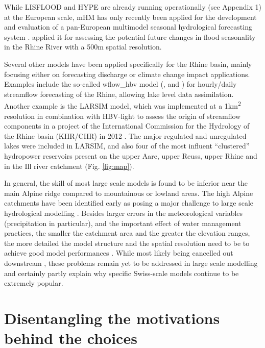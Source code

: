 \documentclass[10pt,a4paper]{article}
\begin{document}
While LISFLOOD and HYPE are already running operationally (see Appendix
1) at the European scale, mHM has only recently been applied for the
development and evaluation of a pan-European multimodel seasonal
hydrological forecasting
system \citep{Wanders_2019}. \citet{Rottler2020} applied it for assessing
the potential future changes in flood seasonality in the Rhine River
with a 500m spatial resolution. 

Several other models have been applied specifically for the Rhine basin,
mainly focusing either on forecasting discharge or climate change impact
applications. Examples include the so-called wflow\_hbv model
(\citealp{van_Osnabrugge_2017}, \citealp{van_Osnabrugge_2019} and \citealt{van_Osnabrugge}) for
hourly/daily streamflow forecasting of the Rhine, allowing lake level
data assimilation. Another example is the LARSIM model, which was
implemented at a 1km\textsuperscript{2} resolution in combination with
HBV-light to assess the origin of streamflow components in a project of
the International Commission for the Hydrology of the Rhine basin
(KHR/CHR) in 2012 \citep{m2017}. The major regulated and
unregulated lakes were included in LARSIM, and also four of the most
influent ``clustered'' hydropower reservoirs present on the upper Aare,
upper Reuss, upper Rhine and in the Ill river catchment
(Fig. \ref{fig:map}).

In general, the skill of most large scale models is found to be inferior
near the main Alpine ridge compared to mountainous or lowland areas. The
high Alpine catchments have been identified early as posing a major
challenge to large scale hydrological modelling \citep{Kleinn_2005}. 
Besides larger errors in the meteorological variables (precipitation in
particular), and the important effect of water management practices, the
smaller the catchment area and the greater the elevation ranges, the
more detailed the model structure and the spatial resolution need to be
to achieve good model performances \citep{Gurtz2003}. While most likely
being cancelled out downstream \citep{Kleinn_2005}, these problems
remain yet to be addressed in large scale modelling and certainly partly
explain why specific Swiss-scale models continue to be extremely
popular. 

\section{Disentangling the motivations behind the choices}
\label{sec:motivations}
\end{document}
